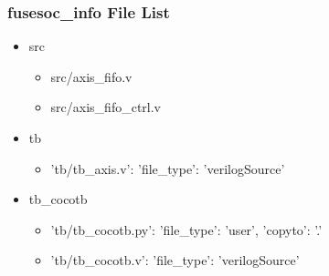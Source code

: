 \subsubsection{fusesoc\_info File List}
\begin{itemize}
\item src
	\begin{itemize}
	\item src/axis\_fifo.v
	\item src/axis\_fifo\_ctrl.v
	\end{itemize}
\item tb
	\begin{itemize}
	\item {'tb/tb\_axis.v': {'file\_type': 'verilogSource'}}
	\end{itemize}
\item tb\_cocotb
	\begin{itemize}
	\item {'tb/tb\_cocotb.py': {'file\_type': 'user', 'copyto': '.'}}
	\item {'tb/tb\_cocotb.v': {'file\_type': 'verilogSource'}}
	\end{itemize}
\end{itemize}
